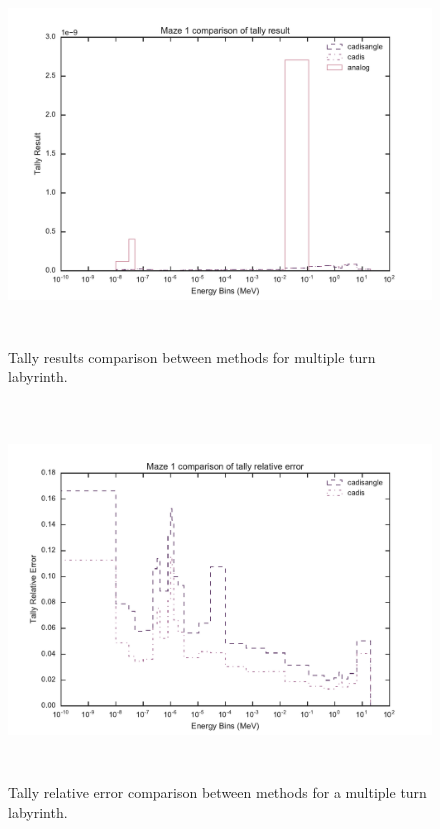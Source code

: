 \begin{figure}[h!]
  \centering
  \includegraphics[height=10cm]{./chapters/characterization_probs/figures/char/maze1/maze_1_tally_result_compare.pdf}
  \caption[Tally results comparison between methods for multiple turn labyrinth.]
  {Tally results comparison between methods for multiple turn labyrinth. }
  \label{fig:maze1result}
\end{figure}

\begin{figure}[h!]
  \centering
  \includegraphics[height=10cm]{./chapters/characterization_probs/figures/char/maze1/maze_1_tally_error_compare.pdf}
  \caption[Tally relative error comparison between methods for multiple turn labyrinth]
  {Tally relative error comparison between methods for a multiple turn
  labyrinth. }
  \label{fig:maze1error}
\end{figure}

